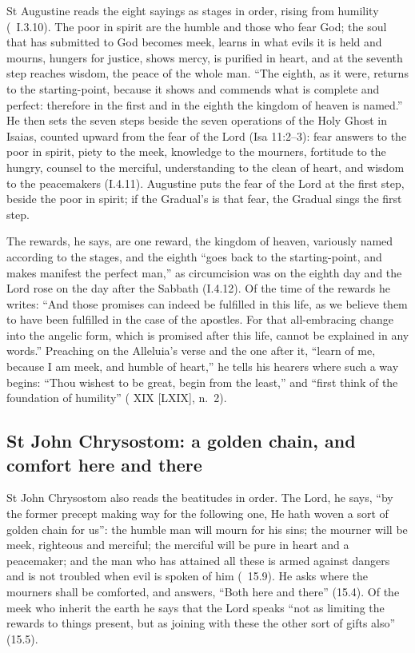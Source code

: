 St Augustine reads the eight sayings as stages in order, rising from humility
(\ I.3.10). The poor in spirit are the humble and those
who fear God; the soul that has submitted to God becomes meek, learns in what
evils it is held and mourns, hungers for justice, shows mercy, is purified in
heart, and at the seventh step reaches wisdom, the peace of the whole man.
``The eighth, as it were, returns to the starting-point, because it shows and
commends what is complete and perfect: therefore in the first and in the
eighth the kingdom of heaven is named.'' He then sets the seven steps beside
the seven operations of the Holy Ghost in Isaias, counted upward from the
fear of the Lord (Isa 11:2--3): fear answers to the poor in spirit, piety to
the meek, knowledge to the mourners, fortitude to the hungry, counsel to the
merciful, understanding to the clean of heart, and wisdom to the peacemakers
(I.4.11). Augustine puts the fear of the Lord at the first step, beside the
poor in spirit; if the Gradual's  is that fear, the
Gradual sings the first step.

The rewards, he says, are one reward, the kingdom of heaven, variously named
according to the stages, and the eighth ``goes back to the starting-point, and
makes manifest the perfect man,'' as circumcision was on the eighth day and the
Lord rose on the day after the Sabbath (I.4.12). Of the time of the rewards
he writes: ``And those promises can indeed be fulfilled in this life, as we
believe them to have been fulfilled in the case of the apostles. For that
all-embracing change into the angelic form, which is promised after this
life, cannot be explained in any words.'' Preaching on the Alleluia's verse
and the one after it, ``learn of me, because I am meek, and humble of heart,''
he tells his hearers where such a way begins: ``Thou wishest to be great, begin
from the least,'' and ``first think of the foundation of humility''
( XIX [LXIX], n.~2).

\subsection{St John Chrysostom: a golden chain, and comfort here and there}
\label{sec:beatitudes-chrysostom}

St John Chrysostom also reads the beatitudes in order. The Lord, he says,
``by the former precept making way for the following one, He hath woven a
sort of golden chain for us'': the humble man will mourn for his sins; the
mourner will be meek, righteous and merciful; the merciful will be pure in
heart and a peacemaker; and the man who has attained all these is armed
against dangers and is not troubled when evil is spoken of him
(\ 15.9). He asks where the mourners shall be
comforted, and answers, ``Both here and there'' (15.4). Of the meek who
inherit the earth he says that the Lord speaks ``not as limiting the rewards
to things present, but as joining with these the other sort of gifts also''
(15.5).

